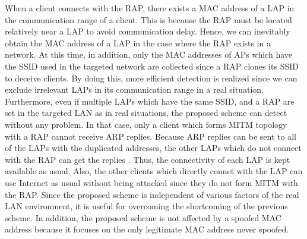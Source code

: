 \documentclass[paper]{ieice}
\begin{document}
When a client connects with the RAP, there exists a MAC address of a LAP in the communication range of a client.
This is because the RAP must be located relatively near a LAP to avoid communication delay.
Hence, we can inevitably obtain the MAC address of a LAP in the case where the RAP exists in a network.
At this time, in addition, only the MAC addresses of APs which have the SSID used in the targeted network are collected since a RAP clones its SSID to deceive clients.
By doing this, more efficient detection is realized since we can exclude irrelevant LAPs in its communication range in a real situation.
Furthermore, even if multiple LAPs which have the same SSID, and a RAP are set in the targeted LAN as in real situations, the proposed scheme can detect without any problem.
In that case, only a client which forms MITM topology with a RAP cannot receive ARP replies.
Because ARP replies can be sent to all of the LAPs with the duplicated addresses, the other LAPs which do not connect with the RAP can get the replies \cite{kataoka}.
Thus, the connectivity of each LAP is kept available as usual.
Also, the other clients which directly connet with the LAP can use Internet as usual without being attacked since they do not form MITM with the RAP.
Since the proposed scheme is independent of various factors of the real LAN environment, it is useful for overcoming the shortcoming of the previous scheme.
In addition, the proposed scheme is not affected by a spoofed MAC address because it focuses on the only legitimate MAC address never spoofed.
\end{document}
